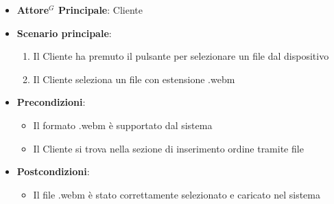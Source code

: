 \label{uc_13.2.5}

\begin{itemize}
	\item \textbf{Attore$^G$ Principale}: Cliente
	\item \textbf{Scenario principale}:
	\begin{enumerate}
		\item Il Cliente ha premuto il pulsante per selezionare un file dal dispositivo
		\item Il Cliente seleziona un file con estensione .webm
	\end{enumerate}
	\item \textbf{Precondizioni}:
	\begin{itemize}
		\item Il formato .webm è supportato dal sistema
		\item Il Cliente si trova nella sezione di inserimento ordine tramite file
	\end{itemize}
	\item \textbf{Postcondizioni}: 
	\begin{itemize}
		\item Il file .webm è stato correttamente selezionato e caricato nel sistema
	\end{itemize}
\end{itemize}